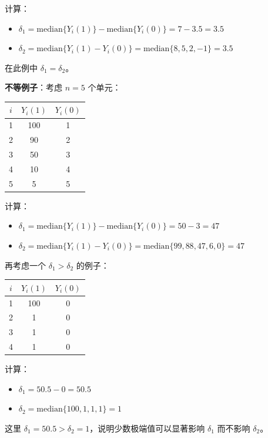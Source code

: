 计算：
\begin{itemize}
  \item $\delta_1 = \text{median}\{Y_i(1)\} - \text{median}\{Y_i(0)\} = 7 - 3.5 = 3.5$
  \item $\delta_2 = \text{median}\{Y_i(1) - Y_i(0)\} = \text{median}\{8, 5, 2, -1\} = 3.5$
\end{itemize}

在此例中 $\delta_1 = \delta_2$。

\textbf{不等例子}：考虑 $n=5$ 个单元：

\begin{center}
\begin{tabular}{ccc}
\hline
$i$ & $Y_i(1)$ & $Y_i(0)$ \\
\hline
1 & 100 & 1 \\
2 & 90 & 2 \\
3 & 50 & 3 \\
4 & 10 & 4 \\
5 & 5 & 5 \\
\hline
\end{tabular}
\end{center}

计算：
\begin{itemize}
  \item $\delta_1 = \text{median}\{Y_i(1)\} - \text{median}\{Y_i(0)\} = 50 - 3 = 47$
  \item $\delta_2 = \text{median}\{Y_i(1) - Y_i(0)\} = \text{median}\{99, 88, 47, 6, 0\} = 47$
\end{itemize}

再考虑一个 $\delta_1 > \delta_2$ 的例子：

\begin{center}
\begin{tabular}{ccc}
\hline
$i$ & $Y_i(1)$ & $Y_i(0)$ \\
\hline
1 & 100 & 0 \\
2 & 1 & 0 \\
3 & 1 & 0 \\
4 & 1 & 0 \\
\hline
\end{tabular}
\end{center}

计算：
\begin{itemize}
  \item $\delta_1 = 50.5 - 0 = 50.5$
  \item $\delta_2 = \text{median}\{100, 1, 1, 1\} = 1$
\end{itemize}

这里 $\delta_1 = 50.5 > \delta_2 = 1$，说明少数极端值可以显著影响 $\delta_1$ 而不影响 $\delta_2$。


